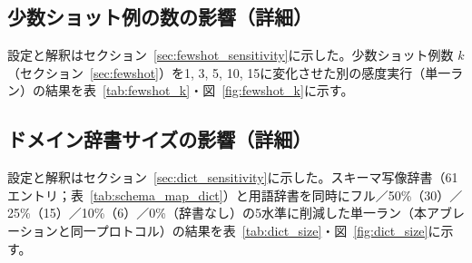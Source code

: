 \documentclass[twocolumn]{interact}
\makeatletter
\def\toprule{\noalign{\ifnum0=`}\fi
  \@aboverulesep=\abovetopsep
  \global\@belowrulesep=\belowrulesep
  \global\@thisruleclass=\@ne
  \@ifnextchar[{\@BTrule}{\@BTrule[\heavyrulewidth]}}
\def\midrule{\noalign{\ifnum0=`}\fi
  \@aboverulesep=\aboverulesep
  \global\@belowrulesep=\belowrulesep
  \global\@thisruleclass=\@ne
  \@ifnextchar[{\@BTrule}{\@BTrule[\lightrulewidth]}}
\def\bottomrule{\noalign{\ifnum0=`}\fi
  \@aboverulesep=\aboverulesep
  \global\@belowrulesep=\belowbottomsep
  \global\@thisruleclass=\@ne
  \@ifnextchar[{\@BTrule}{\@BTrule[\heavyrulewidth]}}
\makeatother
\begin{document}
\subsection{少数ショット例の数の影響（詳細）}

設定と解釈はセクション~\ref{sec:fewshot_sensitivity}に示した。少数ショット例数 $k$（セクション~\ref{sec:fewshot}）を1, 3, 5, 10, 15に変化させた別の感度実行（単一ラン）の結果を表~\ref{tab:fewshot_k}・図~\ref{fig:fewshot_k}に示す。

\begin{table}[htbp]
\centering
\caption{少数ショット数 $k$ と精度の関係（別の感度実行で測定）。
精度とレイテンシのバランスに最適なのは $k=3$ である。
別の感度実行で測定したため、レイテンシ値は
表~\ref{tab:latency} の値と異なる（完全な5回のアブレーションで30.9\,s）。}
\label{tab:fewshot_k}
\footnotesize
{}
\end{table}


\subsection{ドメイン辞書サイズの影響（詳細）}

設定と解釈はセクション~\ref{sec:dict_sensitivity}に示した。スキーマ写像辞書（61エントリ；表~\ref{tab:schema_map_dict}）と用語辞書を同時にフル／50\%（30）／25\%（15）／10\%（6）／0\%（辞書なし）の5水準に削減した単一ラン（本アブレーションと同一プロトコル）の結果を表~\ref{tab:dict_size}・図~\ref{fig:dict_size}に示す。
\end{document}
